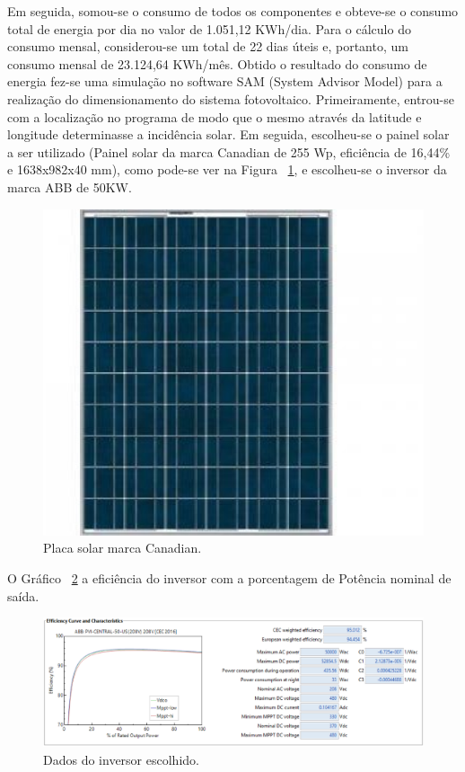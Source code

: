 Em seguida, somou-se o consumo de todos os componentes e obteve-se o consumo total de energia por dia no valor de 1.051,12 KWh/dia. Para o cálculo do consumo mensal, considerou-se um total de 22 dias úteis  e, portanto, um consumo mensal de 23.124,64 KWh/mês. 
Obtido o resultado do consumo de energia fez-se uma simulação no software SAM (System Advisor Model) para a realização do dimensionamento do sistema fotovoltaico. Primeiramente, entrou-se com a localização no programa de modo que o mesmo através da latitude e longitude determinasse a incidência solar. Em seguida, escolheu-se o painel solar a ser utilizado (Painel solar da marca Canadian de 255 Wp, eficiência de 16,44\% e 1638x982x40 mm), como pode-se ver na Figura ~\ref{fig:placa}, e escolheu-se o inversor da marca ABB de 50KW. 

\begin{figure}[!h]
  \centering
  \includegraphics[keepaspectratio=true,scale=0.8]{figuras/placa.eps}
  \caption{Placa solar marca Canadian.}
  \label{fig:placa}
\end{figure}

O Gráfico ~\ref{fig:smartgrid1} a eficiência do inversor com a porcentagem de Potência nominal de saída.

\begin{figure}[!h]
  \centering
  \includegraphics[keepaspectratio=true,scale=0.5]{figuras/smartgrid1.eps}
  \caption{Dados do inversor escolhido.}
  \label{fig:smartgrid1}
\end{figure}

